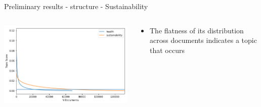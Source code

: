 \documentclass[9pt]{beamer}
\begin{document}
\begin{frame}{Preliminary results - structure - Sustainability}



\begin{columns}
	\begin{column}{0.6\linewidth}
		\begin{center}			
			\includegraphics[width=\linewidth]{../plots/health_sustain_386.PNG}
		\end{center}
	\end{column}
	\begin{column}{0.4\linewidth}
		\begin{center}
			\begin{itemize}
				\item The flatness of its distribution across documents indicates a topic that occurs
			\end{itemize}
		\end{center}
	\end{column}
\end{columns}

\end{frame}

\end{document}
